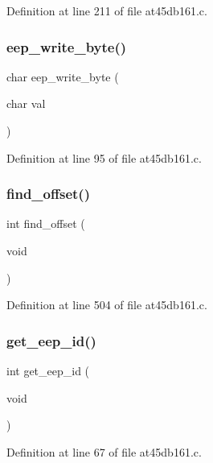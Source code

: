 Definition at line 211 of file at45db161.\+c.

\mbox{\label{at45db161_8c_ab8a4b9d7cb87df4fe2a08f16425ba35c}} 
\subsubsection{eep\+\_\+write\+\_\+byte()}
{\footnotesize\ttfamily char eep\+\_\+write\+\_\+byte (\begin{DoxyParamCaption}\item[{char}]{val }\end{DoxyParamCaption})}



Definition at line 95 of file at45db161.\+c.

\mbox{\label{at45db161_8c_ae31a6837673e8e8ee1012f92c4c77a58}} 
\subsubsection{find\+\_\+offset()}
{\footnotesize\ttfamily int find\+\_\+offset (\begin{DoxyParamCaption}\item[{void}]{ }\end{DoxyParamCaption})}



Definition at line 504 of file at45db161.\+c.

\mbox{\label{at45db161_8c_a37e2d1e5c9cee1f787749317d8921d74}} 
\subsubsection{get\+\_\+eep\+\_\+id()}
{\footnotesize\ttfamily int get\+\_\+eep\+\_\+id (\begin{DoxyParamCaption}\item[{void}]{ }\end{DoxyParamCaption})}



Definition at line 67 of file at45db161.\+c.

\mbox{\label{at45db161_8c_af326c2e66793e0caaecc96b8acbc67fd}} 

